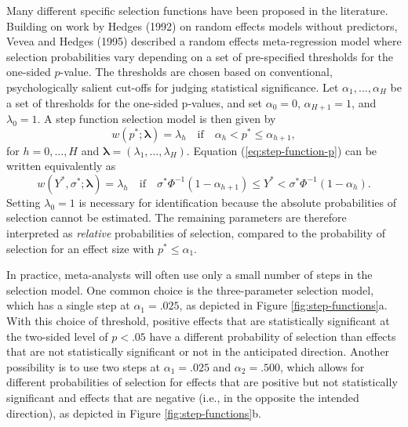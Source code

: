 \documentclass[
  american,
  man, donotrepeattitle,floatsintext]{apa7}
\begin{document}
Many different specific selection functions have been proposed in the literature.
Building on work by Hedges (1992) on random effects models without predictors, Vevea and Hedges (1995) described a random effects meta-regression model where selection probabilities vary depending on a set of pre-specified thresholds for the one-sided \(p\)-value.
The thresholds are chosen based on conventional, psychologically salient cut-offs for judging statistical significance.
Let \(\alpha_1,...,\alpha_H\) be a set of thresholds for the one-sided p-values, and set \(\alpha_0 = 0\), \(\alpha_{H+1} = 1\), and \(\lambda_0 = 1\).
A step function selection model is then given by
\begin{equation}
\label{eq:step-function-p}
w(p^*; \boldsymbol\lambda) =  \lambda_h \quad \text{if} \quad \alpha_{h} < p^* \leq \alpha_{h+1}, 
\end{equation}
for \(h = 0,...,H\) and \(\boldsymbol\lambda = \left(\lambda_1,...,\lambda_H\right)\).
Equation (\ref{eq:step-function-p}) can be written equivalently as
\begin{equation}
\label{eq:step-function-y}
w(Y^*, \sigma^*; \boldsymbol\lambda) =  \lambda_h \quad \text{if} \quad \sigma^* \Phi^{-1}\left(1 - \alpha_{h+1}\right) \leq Y^*  < \sigma^* \Phi^{-1}\left(1 - \alpha_h\right). 
\end{equation}
Setting \(\lambda_0 = 1\) is necessary for identification because the absolute probabilities of selection cannot be estimated.
The remaining parameters are therefore interpreted as \emph{relative} probabilities of selection, compared to the probability of selection for an effect size with \(p^* \leq \alpha_1\).

In practice, meta-analysts will often use only a small number of steps in the selection model.
One common choice is the three-parameter selection model, which has a single step at \(\alpha_1 = .025\), as depicted in Figure \ref{fig:step-functions}a.
With this choice of threshold, positive effects that are statistically significant at the two-sided level of \(p < .05\) have a different probability of selection than effects that are not statistically significant or not in the anticipated direction.
Another possibility is to use two steps at \(\alpha_1 = .025\) and \(\alpha_2 = .500\), which allows for different probabilities of selection for effects that are positive but not statistically significant and effects that are negative (i.e., in the opposite the intended direction), as depicted in Figure \ref{fig:step-functions}b.
\end{document}
